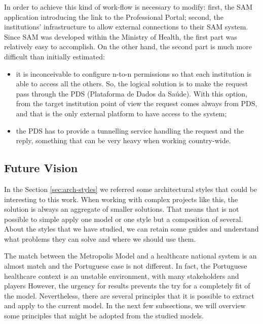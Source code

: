 In order to achieve this kind of work-flow is necessary to modify: first, the SAM application introducing the link to the Professional Portal; second, the institutions' infrastructure to allow external connections to their SAM system. Since SAM was developed within the Ministry of Health, the first part was relatively easy to accomplish. On the other hand, the second part is much more difficult than initially estimated:
\begin{itemize}
\item it is inconceivable to configure n-to-n permissions so that each institution is able to access all the others. So, the logical solution is to make the request pass through the PDS (Plataforma de Dados da Saúde). With this option, from the target institution point of view the request comes always from PDS, and that is the only external platform to have access to the system;
\item the PDS has to provide a tunnelling service handling the request and the reply, something that can be very heavy when working country-wide.
\end{itemize}



\subsection{Future Vision}

In the Section \ref{sec:arch-styles} we referred some architectural styles that could be interesting to this work. When working with complex projects like this, the solution is always an aggregate of smaller solutions. That means that is not possible to simple apply one model or one style but a composition of several. About the styles that we have studied, we can retain some guides and understand what problems they can solve and where we should use them.

The match between the Metropolis Model and a healthcare national system is an almost match and the Portuguese case is not different. In fact, the Portuguese healthcare context is an unstable environment, with many stakeholders and players %
However, the urgency for results prevents the try for a completely fit of the model. Nevertheless, there are several principles that it is possible to extract and apply to the current model. In the next few subsections, we will overview some principles that might be adopted from the studied models.


